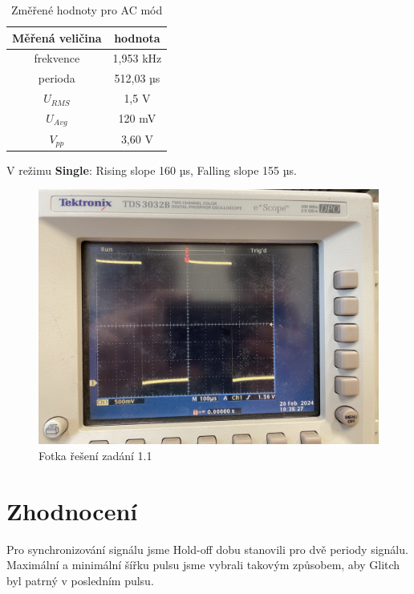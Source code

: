 \begin{table}[h!]

\caption{Změřené hodnoty pro AC mód}
\centering
\begin{tabular}{ | c | c | } 
  \hline
  Měřená veličina & hodnota \\ 
  \hline
  frekvence &  1,953 kHz\\ 
  \hline
  perioda  &  512,03 µs\\
  \hline
  $U_{RMS}$ & 1,5 V \\ 
  \hline
  $U_{Avg}$ & 120 mV \\ 
  \hline
  $V_{pp}$ &  3,60 V\\ 
  \hline
  
\end{tabular}
\label{table:4}
\end{table}

V režimu \textbf{Single}: Rising slope 160 µs, Falling slope 155 µs.
\\
\newpage

\begin{figure}[h]
\centering
\includegraphics[width=12cm]{images/mereni-1.jpg}
\caption{Fotka řešení zadání 1.1}
\label{fig:1}
\end{figure}


\section{Zhodnocení}
Pro synchronizování signálu jsme Hold-off dobu stanovili pro dvě periody signálu. Maximální a minimální šířku pulsu jsme vybrali takovým způsobem, aby Glitch byl patrný v posledním pulsu.
